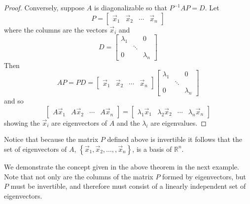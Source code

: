 \documentclass{ximera}
\begin{document}
\begin{proof}
Conversely, suppose $A$ is diagonalizable so that $P^{-1}AP=D.$ Let
\begin{equation*}
P=\begin{bmatrix}
\vec{x}_1 & \vec{x}_2 & \cdots & \vec{x}_n
\end{bmatrix}
\end{equation*}
 where the columns are the vectors $\vec{x}_i$ and
\begin{equation*}
D=\begin{bmatrix}
\lambda _{1} &  & 0 \\
& \ddots &  \\
0 &  & \lambda _{n}
\end{bmatrix}
\end{equation*}
Then
\begin{equation*}
AP=PD=\begin{bmatrix}
\vec{x}_1 & \vec{x}_2 & \cdots & \vec{x}_n
\end{bmatrix} \begin{bmatrix}
\lambda _{1} &  & 0 \\
& \ddots &  \\
0 &  & \lambda _{n}
\end{bmatrix}
\end{equation*}
and so
\begin{equation*}
\begin{bmatrix}
A\vec{x}_1 & A\vec{x}_2 & \cdots & A\vec{x}_n
\end{bmatrix} =\begin{bmatrix}
\lambda _{1}\vec{x}_1 & \lambda _{2}\vec{x}_2 & \cdots & \lambda_{n}\vec{x}_n
\end{bmatrix}
\end{equation*}
showing the $\vec{x}_i$ are eigenvectors of $A$ and the $\lambda _{i}$
are eigenvalues.
\end{proof}

Notice that because the matrix $P$ defined above is invertible it follows that the set of eigenvectors of $A$, $\left\{ \vec{x}_1 , \vec{x}_2 , \ldots, , \vec{x}_n  \right\}$, is a basis of $\mathbb{R}^n$.

We demonstrate the concept given in the above theorem in the next example. Note that not only
are the columns of the matrix $P$ formed by eigenvectors, but $P$ must
be invertible, and therefore must consist of a linearly independent set of eigenvectors. 
\end{document}

